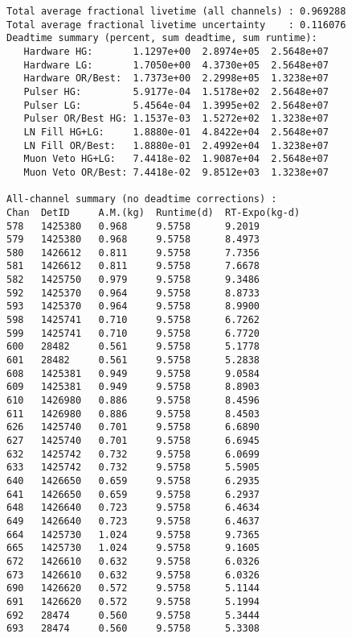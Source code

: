 \documentclass[notitlepage,rmp,aps,10pt]{revtex4-1}
\begin{document}
\begin{verbatim}
Total average fractional livetime (all channels) : 0.969288
Total average fractional livetime uncertainty    : 0.116076
Deadtime summary (percent, sum deadtime, sum runtime):
   Hardware HG:       1.1297e+00  2.8974e+05  2.5648e+07
   Hardware LG:       1.7050e+00  4.3730e+05  2.5648e+07
   Hardware OR/Best:  1.7373e+00  2.2998e+05  1.3238e+07
   Pulser HG:         5.9177e-04  1.5178e+02  2.5648e+07
   Pulser LG:         5.4564e-04  1.3995e+02  2.5648e+07
   Pulser OR/Best HG: 1.1537e-03  1.5272e+02  1.3238e+07
   LN Fill HG+LG:     1.8880e-01  4.8422e+04  2.5648e+07
   LN Fill OR/Best:   1.8880e-01  2.4992e+04  1.3238e+07
   Muon Veto HG+LG:   7.4418e-02  1.9087e+04  2.5648e+07
   Muon Veto OR/Best: 7.4418e-02  9.8512e+03  1.3238e+07

All-channel summary (no deadtime corrections) :
Chan  DetID     A.M.(kg)  Runtime(d)  RT-Expo(kg-d)
578   1425380   0.968     9.5758      9.2019
579   1425380   0.968     9.5758      8.4973
580   1426612   0.811     9.5758      7.7356
581   1426612   0.811     9.5758      7.6678
582   1425750   0.979     9.5758      9.3486
592   1425370   0.964     9.5758      8.8733
593   1425370   0.964     9.5758      8.9900
598   1425741   0.710     9.5758      6.7262
599   1425741   0.710     9.5758      6.7720
600   28482     0.561     9.5758      5.1778
601   28482     0.561     9.5758      5.2838
608   1425381   0.949     9.5758      9.0584
609   1425381   0.949     9.5758      8.8903
610   1426980   0.886     9.5758      8.4596
611   1426980   0.886     9.5758      8.4503
626   1425740   0.701     9.5758      6.6890
627   1425740   0.701     9.5758      6.6945
632   1425742   0.732     9.5758      6.0699
633   1425742   0.732     9.5758      5.5905
640   1426650   0.659     9.5758      6.2935
641   1426650   0.659     9.5758      6.2937
648   1426640   0.723     9.5758      6.4634
649   1426640   0.723     9.5758      6.4637
664   1425730   1.024     9.5758      9.7365
665   1425730   1.024     9.5758      9.1605
672   1426610   0.632     9.5758      6.0326
673   1426610   0.632     9.5758      6.0326
690   1426620   0.572     9.5758      5.1144
691   1426620   0.572     9.5758      5.1994
692   28474     0.560     9.5758      5.3444
693   28474     0.560     9.5758      5.3308
\end{verbatim}
\end{document}
